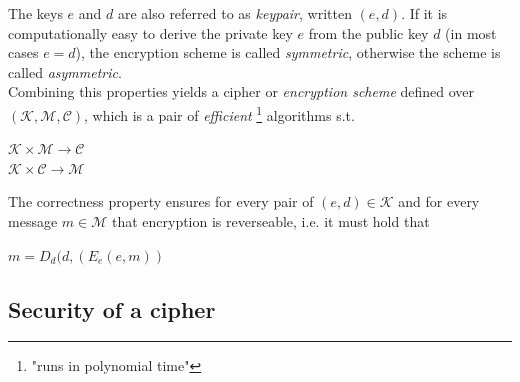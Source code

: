 The keys $e$ and $d$ are also referred to as \textit{keypair}, written $(e,d)$. 
If it is computationally easy to derive the private key $e$ from the public key $d$ (in most cases $e = d$), the encryption scheme
is called \textit{symmetric}, otherwise the scheme is called \textit{asymmetric}.
\\
Combining this properties yields a cipher or \textit{encryption scheme} defined over $\mathcal{(K,M,C)}$, which is a pair of \textit{efficient}
 \footnote{"runs in polynomial time"} algorithms s.t.
 \begin{center}
   $\mathcal{K} \times \mathcal{M} \rightarrow \mathcal{C}$
   \\
   $\mathcal{K} \times \mathcal{C} \rightarrow \mathcal{M}$
 \end{center}
 The correctness property ensures for every pair of $(e,d) \in \mathcal{K}$ and for every message $m \in \mathcal{M}$ that encryption is reverseable, i.e. 
 it must hold that 
 \begin{center}  
 $ m = D_d(d, (E_e(e, m))$
  \end{center}

\subsection{Security of a cipher}

